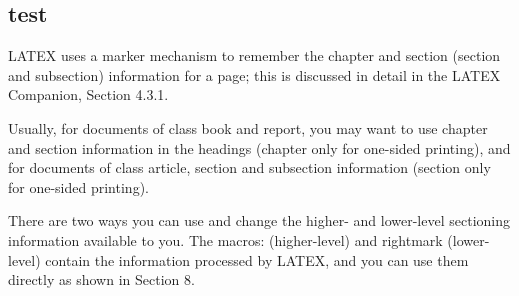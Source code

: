 \subsection{test}LATEX uses a
marker mechanism to remember the chapter and section (section and subsection) information for
a page; this is discussed in detail in the LATEX Companion, Section 4.3.1.


Usually, for documents of class book and report, you may want to use chapter and section
information in the headings (chapter only for one-sided printing), and for documents of class
article, section and subsection information (section only for one-sided printing).



There are two ways you can use and change the higher- and lower-level sectioning information
available to you. The macros:  (higher-level) and rightmark (lower-level) contain
the information processed by LATEX, and you can use them directly as shown in Section 8.
